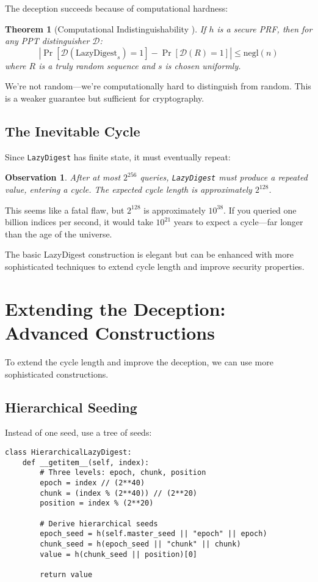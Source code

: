 \documentclass[11pt]{article}
\newtheorem{theorem}{Theorem}
\newtheorem{observation}{Observation}
\begin{document}
The deception succeeds because of computational hardness:

\begin{theorem}[Computational Indistinguishability \cite{goldreich2001foundations}]
If $h$ is a secure PRF, then for any PPT distinguisher $\mathcal{D}$:
$$\left|\Pr[\mathcal{D}(\text{LazyDigest}_s) = 1] - \Pr[\mathcal{D}(R) = 1]\right| \leq \text{negl}(n)$$
where $R$ is a truly random sequence and $s$ is chosen uniformly.
\end{theorem}

We're not random---we're computationally hard to distinguish from random. This is a weaker guarantee but sufficient for cryptography.

\subsection{The Inevitable Cycle}

Since \texttt{LazyDigest} has finite state, it must eventually repeat:

\begin{observation}
After at most $2^{256}$ queries, \texttt{LazyDigest} must produce a repeated value, entering a cycle. The expected cycle length is approximately $2^{128}$.
\end{observation}

This seems like a fatal flaw, but $2^{128}$ is approximately $10^{38}$. If you queried one billion indices per second, it would take $10^{21}$ years to expect a cycle---far longer than the age of the universe.

The basic LazyDigest construction is elegant but can be enhanced with more sophisticated techniques to extend cycle length and improve security properties.

\section{Extending the Deception: Advanced Constructions}

To extend the cycle length and improve the deception, we can use more sophisticated constructions.

\subsection{Hierarchical Seeding}

Instead of one seed, use a tree of seeds:

\begin{lstlisting}
class HierarchicalLazyDigest:
    def __getitem__(self, index):
        # Three levels: epoch, chunk, position
        epoch = index // (2**40)
        chunk = (index % (2**40)) // (2**20)
        position = index % (2**20)
        
        # Derive hierarchical seeds
        epoch_seed = h(self.master_seed || "epoch" || epoch)
        chunk_seed = h(epoch_seed || "chunk" || chunk)
        value = h(chunk_seed || position)[0]
        
        return value
\end{lstlisting}
\end{document}

